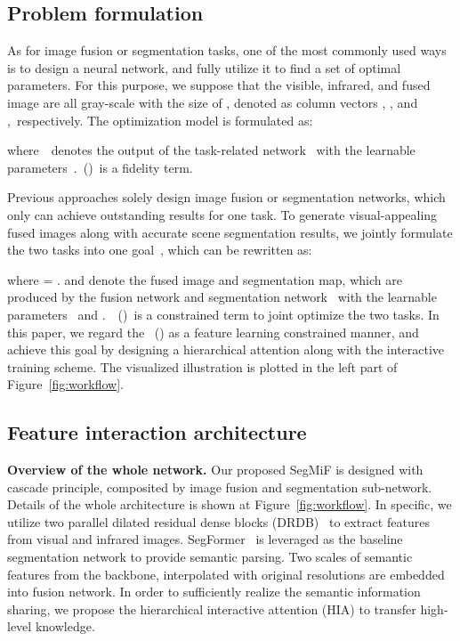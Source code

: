 \documentclass[10pt,twocolumn,letterpaper]{article}
\begin{document}
\subsection{Problem formulation}
As for image fusion or segmentation tasks, one of the most commonly used ways is to design a neural network, and fully utilize it to find a set of optimal parameters. For this purpose, we suppose that the visible, infrared,  and fused image are all gray-scale with the size of , denoted as column vectors , , and ,~respectively. The optimization model is formulated as:

where~~denotes the output of the task-related network~ with the learnable parameters~.~()~is a fidelity term.

Previous approaches solely design image fusion or segmentation networks, which only can achieve outstanding results for one task. To generate visual-appealing fused images along with accurate scene segmentation results, we jointly formulate the two tasks into one goal~\cite{liu2021investigating,sun2022detfusion,sun2022drone}, which can be rewritten as: 



where  = .  and  denote the fused image and segmentation map, which are produced by the fusion network  and segmentation network~ with the learnable parameters~ and .~~()~is a constrained term to joint optimize the two tasks. In this paper,  we regard the ~() as a feature learning constrained manner, and achieve this goal by designing a hierarchical  attention along with the interactive training scheme. The visualized illustration is plotted in the left part of Figure~\ref{fig:workflow}.
\subsection{Feature interaction architecture}
\textbf{Overview of the whole network.} Our proposed SegMiF is designed with cascade principle, composited by image fusion and segmentation sub-network. Details of the whole architecture is shown at Figure~\ref{fig:workflow}.
In specific, we utilize two parallel dilated residual dense blocks (DRDB)~\cite{ZhaoZXLP22,yan2019attention} to extract features from visual and infrared images. SegFormer~\cite{xie2021segformer} is leveraged as the baseline segmentation network to provide semantic parsing.  Two scales of semantic features from the backbone, interpolated with original resolutions are embedded into fusion network. In order to sufficiently realize the semantic information sharing, we propose the hierarchical interactive attention (HIA) to transfer high-level knowledge. 
\end{document}
